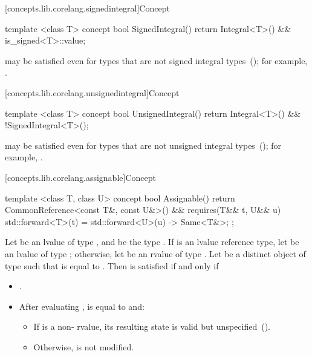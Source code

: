 [concepts.lib.corelang.signedintegral]{Concept }

%
\begin{itemdecl}
template <class T>
concept bool SignedIntegral() {
  return Integral<T>() && is_signed<T>::value;
}
\end{itemdecl}

\begin{itemdescr}
\pnum
\enternote {} may be satisfied even for
types that are not signed integral types~();
for example, .
\exitnote
\end{itemdescr}

[concepts.lib.corelang.unsignedintegral]{Concept }

%
\begin{itemdecl}
template <class T>
concept bool UnsignedIntegral() {
  return Integral<T>() && !SignedIntegral<T>();
}
\end{itemdecl}

\begin{itemdescr}
\pnum
\enternote {} may be satisfied even for
types that are not unsigned integral types~();
for example, .
\exitnote
\end{itemdescr}

[concepts.lib.corelang.assignable]{Concept }

%
\begin{itemdecl}
template <class T, class U>
concept bool Assignable() {
  return CommonReference<const T&, const U&>() && requires(T&& t, U&& u) {
    { std::forward<T>(t) = std::forward<U>(u) } -> Same<T&>;
  };
}
\end{itemdecl}

\begin{itemdescr}
\pnum
Let  be an lvalue of type , and  be the
type . If  is an lvalue reference
type, let  be an lvalue of type ;
otherwise, let  be an rvalue of type .
Let  be a distinct object of type  such that
 is equal to .
Then  is satisfied if and only if

\begin{itemize}
\item {}.
\item After evaluating ,  is equal to  and:
\begin{itemize}
\item If  is a non- rvalue, its resulting
state is valid but unspecified~().
\item Otherwise,  is not modified.
\end{itemize}
\end{itemize}
\end{itemdescr}

